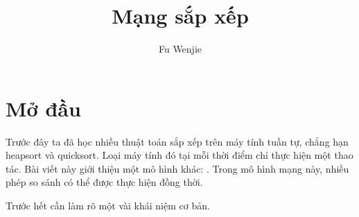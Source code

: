 \documentclass[11pt]{article}
\title{Mạng sắp xếp}
\author{Fu Wenjie}
\date{}
\begin{document}
\maketitle


\section{Mở đầu}

Trước đây ta đã học nhiều thuật toán sắp xếp trên máy tính tuần tự, chẳng hạn
heapsort và quicksort. Loại máy tính đó tại mỗi thời điểm chỉ thực hiện một
thao tác. Bài viết này giới thiệu một mô hình khác: . Trong
mô hình mạng này, nhiều phép so sánh có thể được thực hiện đồng thời.

Trước hết cần làm rõ một vài khái niệm cơ bản.
\end{document}
